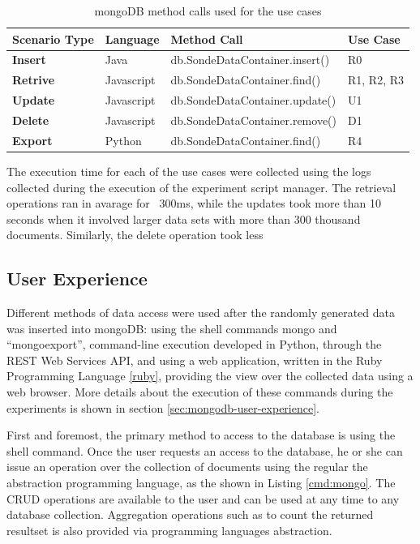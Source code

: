 \begin{table}
    \begin{center}
        \begin{tabular}{|p{70pt}|p{100pt}|p{250pt}|p{100pt}|}\hline
        \textbf{Scenario Type} & \textbf{Language} & \textbf{Method Call} & \textbf{Use Case}\\\hline 
        \textbf{Insert} & Java & db.SondeDataContainer.insert() & R0\\\hline
        \textbf{Retrive} & Javascript & db.SondeDataContainer.find() & R1, R2, R3\\\hline 
        \textbf{Update} & Javascript & db.SondeDataContainer.update() & U1\\\hline 
        \textbf{Delete} & Javascript & db.SondeDataContainer.remove() & D1\\\hline
        \textbf{Export} & Python & db.SondeDataContainer.find() & R4\\\hline
        \end{tabular}
        \caption{mongoDB method calls used for the use cases}
    \end{center}
    \label{tab:experiment-scenarios-mongo-methods}
\end{table}

The execution time for each of the use cases were collected using the logs
collected during the execution of the experiment script manager. The retrieval
operations ran in avarage for ~300ms, while the updates took more than 10
seconds when it involved larger data sets with more than 300 thousand
documents. Similarly, the delete operation took less 

\subsection{User Experience}

Different methods of data access were used after the randomly generated data
was inserted into mongoDB: using the shell commands mongo and ``mongoexport'', 
command-line execution developed in Python, through the REST Web Services API,
and using a web application, written in the Ruby Programming Language
\ref{ruby}, providing the view over the collected data using a web browser.
More details about the execution of these commands during the experiments is
shown in section \ref{sec:mongodb-user-experience}.

First and foremost, the primary method to access to the database is using the
shell command. Once the user requests an access to the database, he or she can
issue an operation over the collection of documents using the regular the
abstraction programming language, as the shown in Listing \ref{cmd:mongo}. The
CRUD operations are available to the user and can be used at any time to any
database collection. Aggregation operations such as to count the returned
resultset is also provided via programming languages abstraction.

